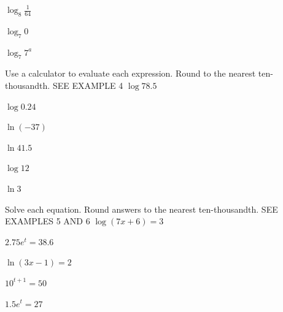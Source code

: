 \documentclass{article}
\newenvironment{practice}[2]{}{}
\begin{document}
\begin{practice}{37}{?}
$\log_8 \frac{1}{64}$
\end{practice}

\begin{practice}{38}{?}
$\log_7 0$
\end{practice}

\begin{practice}{39}{?}
$\log_7 7^a$
\end{practice}

Use a calculator to evaluate each expression. Round to the nearest ten-thousandth. SEE EXAMPLE 4
\begin{practice}{40}{?}
$\log 78.5$
\end{practice}

\begin{practice}{41}{?}
$\log 0.24$
\end{practice}

\begin{practice}{42}{?}
$\ln (-37)$
\end{practice}

\begin{practice}{43}{?}
$\ln 41.5$
\end{practice}

\begin{practice}{44}{?}
$\log 12$
\end{practice}

\begin{practice}{45}{?}
$\ln 3$
\end{practice}

Solve each equation. Round answers to the nearest ten-thousandth. SEE EXAMPLES 5 AND 6
\begin{practice}{46}{?}
$\log (7x + 6) = 3$
\end{practice}

\begin{practice}{47}{?}
$2.75e^t = 38.6$
\end{practice}

\begin{practice}{48}{?}
$\ln (3x - 1) = 2$
\end{practice}

\begin{practice}{49}{?}
$10^{t+1} = 50$
\end{practice}

\begin{practice}{50}{?}
$1.5e^t = 27$
\end{practice}
\end{document}
